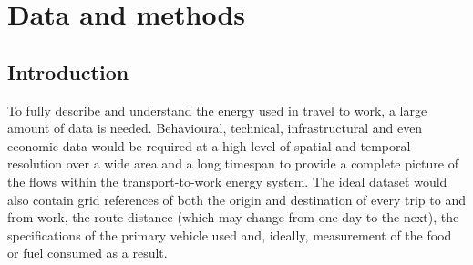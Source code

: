\documentclass[a4paper, 11pt, twoside]{Thesis}
\begin{document}
\label{s:applications}

 

\chapter{Data and methods} 
\label{Chapter4}
\fancyhead[RE,LO]{\thepage}
\section{Introduction} 
To fully describe and understand the energy used in travel to work, a large
amount of data is needed. Behavioural, technical, infrastructural and even
economic data would be required at a high level of spatial and temporal
resolution over a wide area and a long timespan to provide a complete
picture of the flows within the transport-to-work energy system. 
The ideal dataset would also contain grid references of both the origin and
destination of every trip to and from work, the
route distance (which may change from one day to the next), the specifications
of the primary vehicle used and, ideally, measurement of the food or fuel
consumed as a result.
\end{document}
